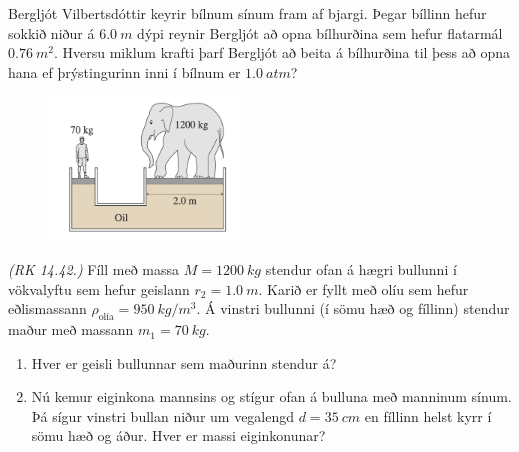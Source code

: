 \ifdefined \wholebook \else\documentclass[oneside]{book}\usepackage{EdlBook}\graphicspath{{figures/}}
\begin{document}
\begin{enumerate}[label = \textbf{Dæmi \thechapter.\arabic*.}]
\item Bergljót Vilbertsdóttir keyrir bílnum sínum fram af bjargi. Þegar bíllinn hefur sokkið niður á $\SI{6.0}{m}$ dýpi reynir Bergljót að opna bílhurðina sem hefur flatarmál $\SI{0.76}{m^2}$. Hversu miklum krafti þarf Bergljót að beita á bílhurðina til þess að opna hana ef þrýstingurinn inni í bílnum er $\SI{1.0}{atm}$?

\vspace{0.5cm}

\begin{minipage}{\linewidth}

\begin{figure}
\vspace{-0.75cm}
\includegraphics[width=2in]{images/fill.png}
\end{figure}

\item \textit{(RK 14.42.)} Fíll með massa $M = \SI{1200}{kg}$ stendur ofan á hægri bullunni í vökvalyftu sem hefur geislann $r_2 = \SI{1.0}{m}$. Karið er fyllt með olíu sem hefur eðlismassann $\rho_{\text{olía}} = \SI{950}{kg/m^3}$. Á vinstri bullunni (í sömu hæð og fíllinn) stendur maður með massann $m_1 = \SI{70}{kg}$.

\begin{enumerate}[label = \textbf{(\alph*)}]
    \item Hver er geisli bullunnar sem maðurinn stendur á?
    \item Nú kemur eiginkona mannsins og stígur ofan á bulluna með manninum sínum. Þá sígur vinstri bullan niður um vegalengd $d = \SI{35}{cm}$ en fíllinn helst kyrr í sömu hæð og áður. Hver er massi eiginkonunar?
\end{enumerate}

\end{minipage}

\vspace{0.5cm}

\begin{minipage}{\linewidth}


\end{minipage}
\end{enumerate}
\end{document}
